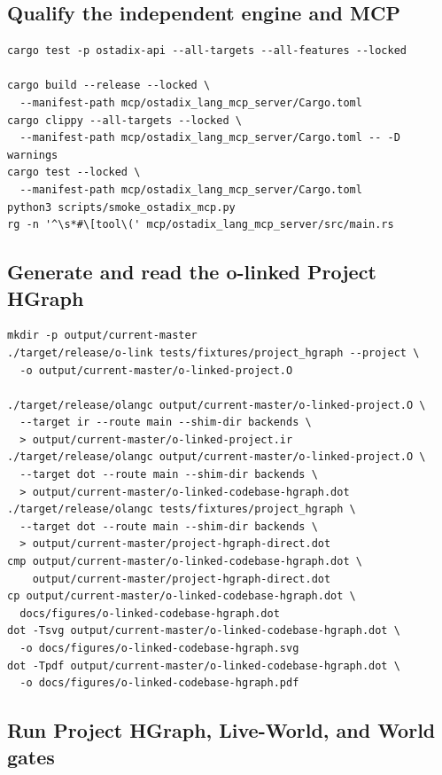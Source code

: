 \documentclass[11pt,oneside]{article}
\begin{document}
\subsection{Qualify the independent engine and MCP}

\begin{lstlisting}[style=plaincode]
cargo test -p ostadix-api --all-targets --all-features --locked

cargo build --release --locked \
  --manifest-path mcp/ostadix_lang_mcp_server/Cargo.toml
cargo clippy --all-targets --locked \
  --manifest-path mcp/ostadix_lang_mcp_server/Cargo.toml -- -D warnings
cargo test --locked \
  --manifest-path mcp/ostadix_lang_mcp_server/Cargo.toml
python3 scripts/smoke_ostadix_mcp.py
rg -n '^\s*#\[tool\(' mcp/ostadix_lang_mcp_server/src/main.rs
\end{lstlisting}

\subsection{Generate and read the o-linked Project HGraph}

\begin{lstlisting}[style=plaincode]
mkdir -p output/current-master
./target/release/o-link tests/fixtures/project_hgraph --project \
  -o output/current-master/o-linked-project.O

./target/release/olangc output/current-master/o-linked-project.O \
  --target ir --route main --shim-dir backends \
  > output/current-master/o-linked-project.ir
./target/release/olangc output/current-master/o-linked-project.O \
  --target dot --route main --shim-dir backends \
  > output/current-master/o-linked-codebase-hgraph.dot
./target/release/olangc tests/fixtures/project_hgraph \
  --target dot --route main --shim-dir backends \
  > output/current-master/project-hgraph-direct.dot
cmp output/current-master/o-linked-codebase-hgraph.dot \
    output/current-master/project-hgraph-direct.dot
cp output/current-master/o-linked-codebase-hgraph.dot \
  docs/figures/o-linked-codebase-hgraph.dot
dot -Tsvg output/current-master/o-linked-codebase-hgraph.dot \
  -o docs/figures/o-linked-codebase-hgraph.svg
dot -Tpdf output/current-master/o-linked-codebase-hgraph.dot \
  -o docs/figures/o-linked-codebase-hgraph.pdf
\end{lstlisting}

\subsection{Run Project HGraph, Live-World, and World gates}
\end{document}
